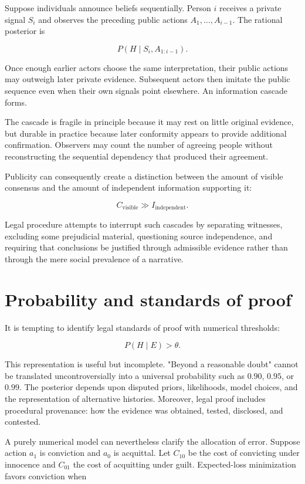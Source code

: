 Suppose individuals announce beliefs sequentially. Person \(i\) receives a private signal \(S_i\) and observes the preceding public actions \(A_1,\ldots,A_{i-1}\). The rational posterior is

\[
P(H\mid S_i,A_{1:i-1}).
\]

Once enough earlier actors choose the same interpretation, their public actions may outweigh later private evidence. Subsequent actors then imitate the public sequence even when their own signals point elsewhere. An information cascade forms.

The cascade is fragile in principle because it may rest on little original evidence, but durable in practice because later conformity appears to provide additional confirmation. Observers may count the number of agreeing people without reconstructing the sequential dependency that produced their agreement.

Publicity can consequently create a distinction between the amount of visible consensus and the amount of independent information supporting it:

\[
C_{\mathrm{visible}}
\gg
I_{\mathrm{independent}}.
\]

Legal procedure attempts to interrupt such cascades by separating witnesses, excluding some prejudicial material, questioning source independence, and requiring that conclusions be justified through admissible evidence rather than through the mere social prevalence of a narrative.

\section{Probability and standards of proof}
\label{sec:a31}

It is tempting to identify legal standards of proof with numerical thresholds:

\[
P(H\mid E)>\theta.
\]

This representation is useful but incomplete. "Beyond a reasonable doubt" cannot be translated uncontroversially into a universal probability such as \(0.90\), \(0.95\), or \(0.99\). The posterior depends upon disputed priors, likelihoods, model choices, and the representation of alternative histories. Moreover, legal proof includes procedural provenance: how the evidence was obtained, tested, disclosed, and contested.

A purely numerical model can nevertheless clarify the allocation of error. Suppose action \(a_1\) is conviction and \(a_0\) is acquittal. Let \(C_{10}\) be the cost of convicting under innocence and \(C_{01}\) the cost of acquitting under guilt. Expected-loss minimization favors conviction when

